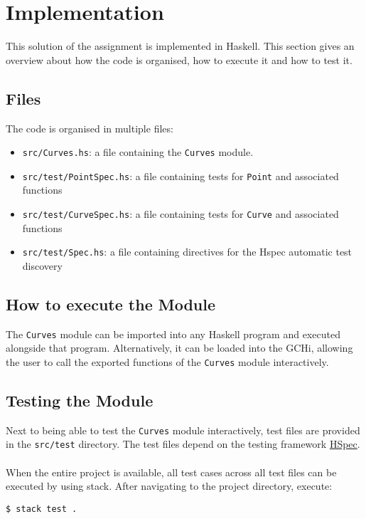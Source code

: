 \documentclass[11pt, a4paper]{article}
\begin{document}
\section{Implementation}
This solution of the assignment is implemented in Haskell. This section gives an overview about how the code is organised, how to execute it and how to test it.

\subsection{Files}
The code is organised in multiple files:
\begin{itemize}
	\item \texttt{src/Curves.hs}: a file containing the \texttt{Curves} module.
	\item \texttt{src/test/PointSpec.hs}: a file containing tests for \texttt{Point} and associated functions
	\item \texttt{src/test/CurveSpec.hs}: a file containing tests for \texttt{Curve} and associated functions
	\item \texttt{src/test/Spec.hs}: a file containing directives for the Hspec automatic test discovery
\end{itemize}

\subsection{How to execute the Module}
The \texttt{Curves} module can be imported into any Haskell program and executed alongside that program. Alternatively, it can be loaded into the GCHi, allowing the user to call the exported functions of the \texttt{Curves} module interactively.


\subsection{Testing the Module}
Next to being able to test the \texttt{Curves} module interactively, test files are provided in the \texttt{src/test} directory. The test files depend on the testing framework \href{http://hspec.github.io/}{HSpec}.
\\
\\
\noindent When the entire project is available, all test cases across all test files can be executed by using stack. After navigating to the project directory, execute:

\begin{lstlisting}[style=Bash]
$ stack test .
\end{lstlisting}
\end{document}
